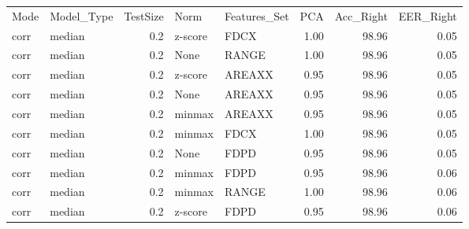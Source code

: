 \begin{tabular}{llrllrrr}
\toprule
Mode & Model\_Type &  TestSize &    Norm & Features\_Set &  PCA &  Acc\_Right &  EER\_Right \\
corr &     median &       0.2 & z-score &         FDCX & 1.00 &      98.96 &       0.05 \\
\midrule
corr &     median &       0.2 &    None &        RANGE & 1.00 &      98.96 &       0.05 \\
corr &     median &       0.2 & z-score &       AREAXX & 0.95 &      98.96 &       0.05 \\
corr &     median &       0.2 &    None &       AREAXX & 0.95 &      98.96 &       0.05 \\
corr &     median &       0.2 &  minmax &       AREAXX & 0.95 &      98.96 &       0.05 \\
corr &     median &       0.2 &  minmax &         FDCX & 1.00 &      98.96 &       0.05 \\
corr &     median &       0.2 &    None &         FDPD & 0.95 &      98.96 &       0.05 \\
corr &     median &       0.2 &  minmax &         FDPD & 0.95 &      98.96 &       0.06 \\
corr &     median &       0.2 &  minmax &        RANGE & 1.00 &      98.96 &       0.06 \\
corr &     median &       0.2 & z-score &         FDPD & 0.95 &      98.96 &       0.06 \\
\bottomrule
\end{tabular}
